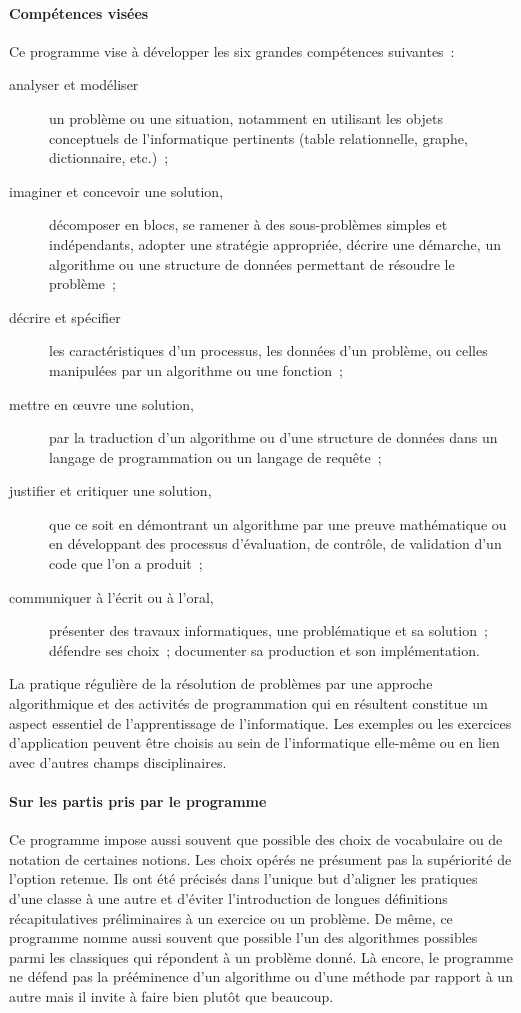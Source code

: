 \paragraph{Compétences visées} Ce programme vise à développer les six grandes compétences suivantes~:
\begin{description}
\item[analyser et modéliser] un problème ou une situation, notamment en utilisant les objets conceptuels de l'informatique pertinents (table relationnelle, graphe, dictionnaire, etc.)~;
\item[imaginer et concevoir une solution,] décomposer en blocs, se ramener à des sous-problèmes simples et indépendants, adopter une stratégie appropriée, décrire une démarche, un algorithme ou une structure de données permettant de résoudre le problème~;
\item[décrire et spécifier] les caractéristiques d'un processus, les données d'un problème, ou celles manipulées par un algorithme ou une fonction~;
\item[mettre en \oe uvre une solution,] par la traduction d'un algorithme ou d'une structure de données dans un langage de programmation ou un langage de requête~;
\item[justifier et critiquer une solution,] que ce soit en démontrant un algorithme par une preuve mathématique ou en développant des processus d'évaluation, de contrôle, de validation d'un code que l'on a produit~;
\item[communiquer à l'écrit ou à l'oral,] présenter des travaux informatiques, une problématique et sa solution~; défendre ses choix~; documenter sa production et son implémentation. 
\end{description}



La pratique régulière de la résolution de problèmes par une approche algorithmique et des activités de programmation qui en résultent constitue un aspect essentiel de l’apprentissage de l’informatique.
Les exemples ou les exercices d'application peuvent être choisis au sein de l'informatique elle-même ou en lien avec 
d'autres champs disciplinaires.

\paragraph{Sur les partis pris par le programme} Ce programme impose aussi souvent que possible des choix de vocabulaire ou de notation de certaines notions. Les choix opérés ne présument pas la supériorité de l’option retenue. Ils ont été précisés dans l’unique but d’aligner les pratiques d’une classe à une autre et d’éviter l’introduction de longues définitions récapitulatives préliminaires à un exercice ou un problème. De même, ce programme nomme aussi souvent que possible l’un des algorithmes possibles parmi les classiques qui répondent à un problème donné. Là encore, le programme ne défend pas la prééminence d’un algorithme ou d’une méthode par rapport à un autre mais il invite à faire bien plutôt que beaucoup.

